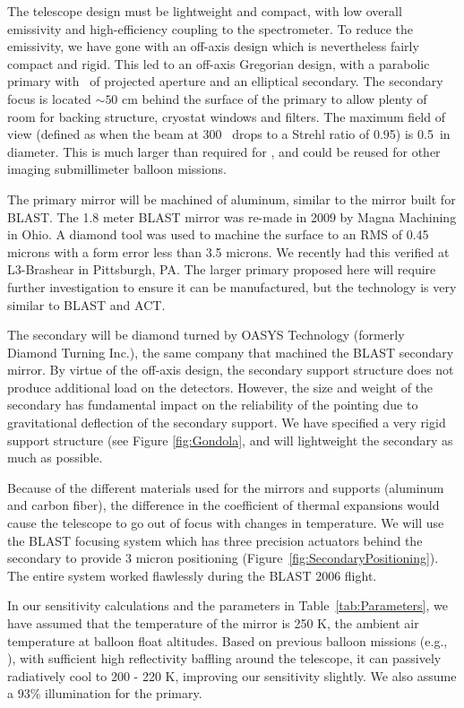 The telescope design must be lightweight and compact, with low overall
emissivity and high-efficiency coupling to the spectrometer.  To
reduce the emissivity, we have gone with an off-axis design which is
nevertheless fairly compact and rigid.  This led to an off-axis
Gregorian design, with a parabolic primary with \D\ of projected
aperture and an elliptical secondary.  The secondary focus is located
$\sim50$ cm behind the surface of the primary to allow plenty of room for
backing structure, cryostat windows and filters.  The maximum field of
view (defined as when the beam at 300 \mum\ drops to a Strehl ratio of
0.95) is 0.5\arcdeg\ in diameter.  This is much larger than required
for \name, and could be reused for other imaging submillimeter
balloon missions.

The primary mirror will be machined of aluminum, similar to the mirror
built for BLAST.  The 1.8 meter BLAST mirror was re-made in 2009 by
Magna Machining in Ohio.  A diamond tool was used to machine the
surface to an RMS of 0.45 microns with a form error less than 3.5
microns.  We recently had this verified at L3-Brashear in Pittsburgh,
PA.  The larger primary proposed here will require further
investigation to ensure it can be manufactured, but the technology is
very similar to BLAST and ACT.

The secondary will be diamond turned by OASYS Technology (formerly
Diamond Turning Inc.), the same company that machined the BLAST
secondary mirror.  By virtue of the off-axis design, the secondary
support structure does not produce additional load on the detectors.
However, the size and weight of the secondary has fundamental impact
on the reliability of the pointing due to gravitational deflection of
the secondary support.  We have specified a very rigid support
structure (see Figure \ref{fig:Gondola}, and will lightweight the
secondary as much as possible.

Because of the different materials used for the mirrors and supports
(aluminum and carbon fiber), the difference in the coefficient of
thermal expansions would cause the telescope to go out of focus with
changes in temperature.  We will use the BLAST focusing system which
has three precision actuators behind the secondary to provide 3 micron
positioning (Figure~\ref{fig:SecondaryPositioning}).  The entire
system worked flawlessly during the BLAST 2006 flight.

In our sensitivity calculations and the parameters in
Table~\ref{tab:Parameters}, we have assumed that the temperature of
the mirror is 250 K, the ambient air temperature at balloon float
altitudes.  Based on previous balloon missions (e.g.,
), with sufficient high reflectivity
baffling around the telescope, it can passively radiatively cool to
200 - 220 K, improving our sensitivity slightly.  We also assume a
93\% illumination for the primary.

